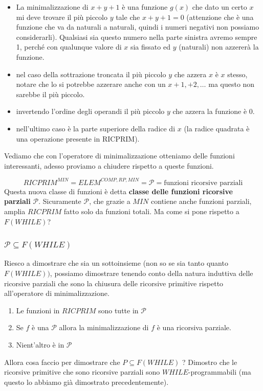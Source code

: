 \documentclass{article}
\begin{document}
\begin{itemize}
    \item La minimalizzazione di $x+y+1$ è una funzione $g(x)$ che dato un certo $x$ mi deve
          trovare il più piccolo $y$ tale che $x+y+1=0$ (attenzione che è una funzione
          che va da naturali a naturali, quindi i numeri negativi non possiamo considerarli).
          Qualsiasi sia questo numero nella parte sinistra avremo sempre 1, perché con qualunque
          valore di $x$ sia fissato ed $y$ (naturali) non azzererà la funzione.

    \item nel caso della sottrazione troncata il più piccolo $y$ che azzera $x$ è $x$ stesso,
          notare che lo si potrebbe azzerare anche con un $x+1,+2,\dots$ ma questo non sarebbe il più piccolo.

    \item invertendo l'ordine degli operandi il più piccolo $y$ che azzera la funzione è 0.

    \item nell'ultimo caso è la parte superiore della radice di $x$ (la radice quadrata
          è una operazione presente in RICPRIM).

\end{itemize}
Vediamo che con l'operatore di minimalizzazione otteniamo delle funzioni interessanti,
adesso proviamo a chiudere rispetto a queste funzioni.

$$RICPRIM^{MIN}= ELEM^{COMP,RP,MIN}=\mathcal{P}={\text{funzioni ricorsive parziali}}$$
Questa nuova classe di funzioni è detta \textbf{classe delle funzioni ricorsive
    parziali} $\mathcal{P}$. Sicuramente $\mathcal{P}$, che grazie a $MIN$ contiene anche
funzioni parziali, amplia $RICPRIM$ fatto solo da funzioni totali. Ma come si pone
rispetto a $F(WHILE)$?
\subsubsection{$\mathcal{P}\subseteq F(WHILE)$}
Riesco a dimostrare che sia un sottoinsieme (non so se sia tanto quanto $F(WHILE))$,
possiamo dimostrare tenendo conto della natura induttiva delle ricorsive parziali che
sono la chiusura delle ricorsive primitive rispetto all'operatore di minimalizzazione.

\begin{enumerate}
    \item Le funzioni in $RICPRIM$ sono tutte in $\mathcal{P}$
    \item Se $f$ è una $\mathcal{P}$ allora la minimalizzazione di $f$ è
          una ricorsiva parziale.
    \item Nient'altro è in $\mathcal{P}$
\end{enumerate}
Allora cosa faccio per dimostrare che $P\subseteq F(WHILE)$ ? Dimostro che le ricorsive
primitive che sono ricorsive parziali sono $WHILE$-programmabili (ma questo lo abbiamo
già dimostrato precedentemente).
\end{document}
